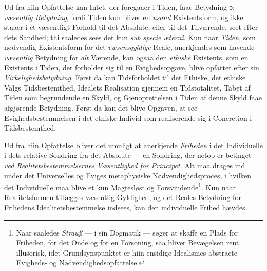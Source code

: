 Ud fra hiin Opfattelse kan Intet, der foregaaer i Tiden, faae Betydning ɔ:
\emph{væsentlig Betydning}, fordi Tiden kun bliver en \emph{usand}
Existentsform, og ikke staaer i et væsentligt Forhold til det Absolute, eller
til det Tilværende, seet efter dets Sandhed; thi saaledes sees det kun
\textit{sub specie æterni}. Kun naar \emph{Tiden}, som nødvendig Existentsform
for det \emph{væsensgyldige} Reale, anerkjendes som havende \emph{væsentlig}
Betydning for \emph{alt} Værende, kan ogsaa den \emph{ethiske} Existents, som en
Existents i Tiden, der forholder sig til en Evighedsopgave, blive opfattet efter
sin \emph{Virkelighedsbetydning}. Først da kan Tidsforholdet til det Ethiske,
det ethiske Valgs Tidsbestemthed, Idealets Realisation gjennem en Tidstotalitet,
Tabet af Tiden som begrundende en Skyld, og Gjenoprettelsen i Tiden af denne
Skyld faae afgjørende Betydning. Først da kan det blive Opgaven, at see
Evighedsbestemmelsen i det ethiske Individ som realiserende sig i Concretion i
Tidsbestemthed.

Ud fra hiin Opfattelse bliver det umuligt at anerkjende \emph{Friheden} i det
Individuelle i dets relative Sondring fra det Absolute --- en Sondring, der
netop er betinget \emph{ved Realitetsbestemmelsernes Væsentlighed for
Principet}. Alt maa drages ind under det Universelles og Eviges metaphysiske
Nødvendighedsproces, i hvilken det Individuelle maa blive et kun Magtesløst og
Forsvindende\footnote{Naar saaledes \emph{Strauß} --- i sin Dogmatik --- søger
at skaffe en Plads for Friheden, for det Onde og for en Forsoning, saa bliver
Bevægelsen rent illusorisk, idet Grundsynspunktet er hiin ensidige Idealismes
abstracte Evigheds- og Nødvendighedsopfattelse.}. Kun naar Realitetsformen
tillægges væsentlig
 Gyldighed, og det Reales Betydning for Frihedens Idealitetsbestemmelse indsees,
kan den individuelle Frihed hævdes.

